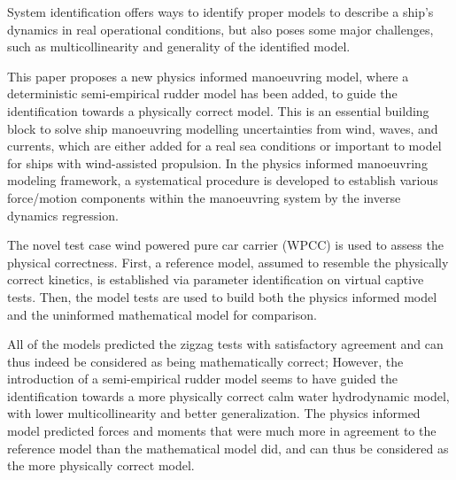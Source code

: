 System identification offers ways to identify proper models to describe a ship's dynamics in real operational conditions, but also poses some major challenges, such as multicollinearity and generality of the identified model. 

This paper proposes a new physics informed manoeuvring model, where a deterministic semi-empirical rudder model has been added, to guide the identification towards a physically correct model.  
This is an essential building block to solve ship manoeuvring modelling uncertainties from wind, waves, and currents, which are either added for a real sea conditions or important to model for ships with wind-assisted propulsion.
In the physics informed manoeuvring modeling framework, a systematical procedure is developed to establish various force/motion components within the manoeuvring system by the inverse dynamics regression. 

The novel test case wind powered pure car carrier (WPCC) is used to assess the physical correctness. First, a reference model, assumed to resemble the physically correct kinetics, is established via parameter identification on virtual captive tests. Then, the model tests are used to build both the physics informed model and the uninformed mathematical model for comparison.

All of the models predicted the zigzag tests with satisfactory agreement and can thus indeed be considered as being mathematically correct; However, the introduction of a semi-empirical rudder model seems to have guided the identification towards a more physically correct calm water hydrodynamic model, with lower multicollinearity and better generalization. The physics informed model predicted forces and moments that were much more in agreement to the reference model than the mathematical model did, and can thus be considered as the more physically correct model. 

